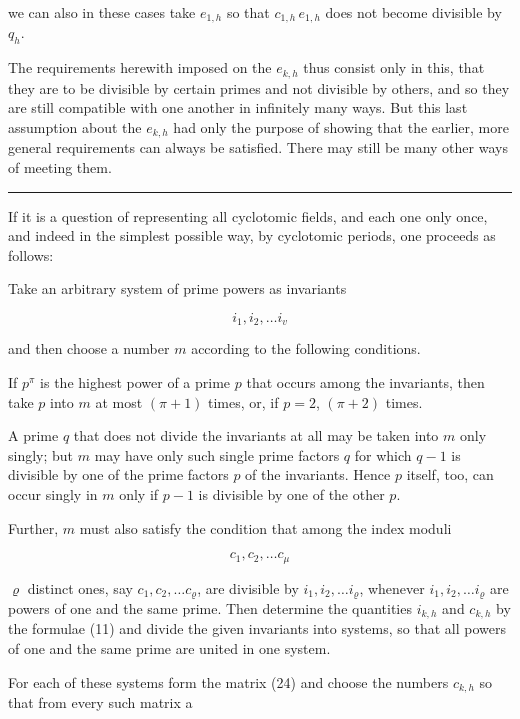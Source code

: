 
we can also in these cases take $e_{1,h}$ so that $c_{1,h}\,e_{1,h}$
does not become divisible by $q_h$.

The requirements herewith imposed on the $e_{k,h}$ thus consist only in
this, that they are to be divisible by certain primes and not divisible
by others, and so they are still compatible with one another in
infinitely many ways. But this last assumption about the $e_{k,h}$ had
only the purpose of showing that the earlier, more general requirements
can always be satisfied. There may still be many other ways of meeting
them.

\noindent\rule{4cm}{0.4pt}

\begin{center}
\end{center}

If it is a question of representing all cyclotomic fields, and each one
only once, and indeed in the simplest possible way, by cyclotomic
periods, one proceeds as follows:

Take an arbitrary system of prime powers as invariants

\[
i_1, i_2, \dots i_v
\]

and then choose a number $m$ according to the following conditions.

If $p^\pi$ is the highest power of a prime $p$ that occurs among the
invariants, then take $p$ into $m$ at most $(\pi+1)$ times, or, if
$p = 2$, $(\pi+2)$ times.

A prime $q$ that does not divide the invariants at all may be taken
into $m$ only singly; but $m$ may have only such single prime factors
$q$ for which $q - 1$ is divisible by one of the prime factors $p$ of
the invariants. Hence $p$ itself, too, can occur singly in $m$ only if
$p - 1$ is divisible by one of the other $p$.

Further, $m$ must also satisfy the condition that among the index
moduli

\[
c_1, c_2, \dots c_\mu
\]

$\varrho$ distinct ones, say $c_1, c_2, \dots c_\varrho$, are divisible
by $i_1, i_2, \dots i_\varrho$, whenever $i_1, i_2, \dots i_\varrho$
are powers of one and the same prime. Then determine the quantities
$i_{k,h}$ and $c_{k,h}$ by the formulae (11) and divide the given
invariants into systems, so that all powers of one and the same prime
are united in one system.

For each of these systems form the matrix (24) and choose the numbers
$c_{k,h}$ so that from every such matrix a
